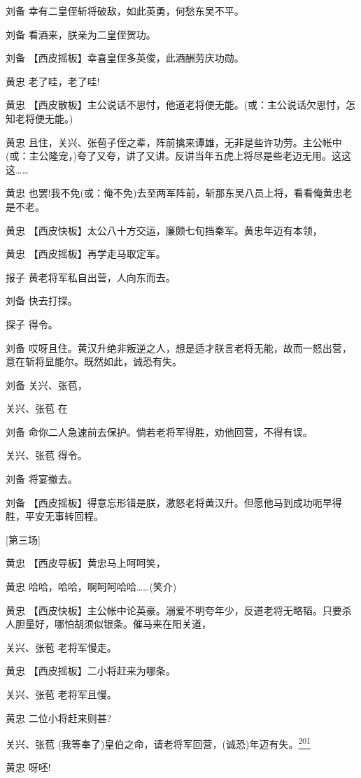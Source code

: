 刘备 幸有二皇侄斩将破敌，如此英勇，何愁东吴不平。

刘备 看酒来，朕亲为二皇侄贺功。

刘备 【西皮摇板】幸喜皇侄多英俊，此酒酬劳庆功勋。

黄忠 老了哇，老了哇!

黄忠
【西皮散板】主公说话不思忖，他道老将便无能。(或：主公说话欠思忖，怎知老将便无能。)

黄忠
且住，关兴、张苞子侄之辈，阵前擒来谭雄，无非是些许功劳。主公帐中(或：主公隆宠，)夸了又夸，讲了又讲。反讲当年五虎上将尽是些老迈无用。这这这\ldots{}\ldots{}

黄忠
也罢!我不免(或：俺不免)去至两军阵前，斩那东吴八员上将，看看俺黄忠老是不老。

黄忠 【西皮快板】太公八十方交运，廉颇七旬挡秦军。黄忠年迈有本领，

黄忠 【西皮摇板】再学走马取定军。

报子 黄老将军私自出营，人向东而去。

刘备 快去打探。

探子 得令。

刘备
哎呀且住。黄汉升绝非叛逆之人，想是适才朕言老将无能，故而一怒出营，意在斩将显能尔。既然如此，诚恐有失。

刘备 关兴、张苞，

关兴、张苞 在

刘备 命你二人急速前去保护。倘若老将军得胜，劝他回营，不得有误。

关兴、张苞 得令。

刘备 将宴撤去。

刘备
【西皮摇板】得意忘形错是朕，激怒老将黄汉升。但愿他马到成功呃早得胜，平安无事转回程。

{[}第三场{]}

黄忠 【西皮导板】黄忠马上呵呵笑，

黄忠 哈哈，哈哈，啊呵呵哈哈\ldots{}\ldots{}(笑介)

黄忠
【西皮快板】主公帐中论英豪。溺爱不明夸年少，反道老将无略韬。只要杀人胆量好，哪怕胡须似银条。催马来在阳关道，

关兴、张苞 老将军慢走。

黄忠 【西皮摇板】二小将赶来为哪条。

关兴、张苞 老将军且慢。

黄忠 二位小将赶来则甚?

关兴、张苞
(我等奉了)皇伯之命，请老将军回营，(诚恐)年迈有失。\protect\hyperlink{fn201}{\textsuperscript{201}}

黄忠 呀呸!

